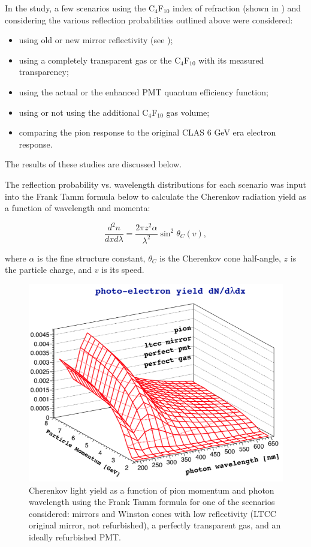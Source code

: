 In the study, a few scenarios using the C$_4$F$_{10}$ index of refraction (shown in )
and considering the various reflection probabilities outlined above  were considered:

\begin{itemize}
	\item using old or new mirror reflectivity (see );
	\item using a completely transparent gas or the C$_4$F$_{10}$ with its measured transparency;
	\item using the actual or the enhanced PMT quantum efficiency function;
	\item using or not using the additional C$_4$F$_{10}$ gas volume;
	\item comparing the pion response to the original CLAS 6 GeV era electron response.
\end{itemize}
\noindent
The results of these studies are discussed below.

The reflection probability vs. wavelength distributions for each scenario was input into the Frank\textendash
Tamm formula \cite{Frank:1937fk} below to calculate the Cherenkov radiation yield as a function of wavelength
and momenta:

\begin{equation}
  \label{eq:cerenkov}
  \frac{d^2n}{dxd\lambda} = \frac{2\pi z^2\alpha}{\lambda^2}\sin^2{\theta_C(v)},
\end{equation}

\noindent
where $\alpha$ is the fine structure constant, $\theta_C$ is the Cherenkov cone half-angle, $z$ is the particle
charge, and $v$ is its speed.

\begin{figure}
	\centering
	\includegraphics[width=0.98\columnwidth, height=0.75\columnwidth]{img/photonYieldStudy.png}
	\caption{Cherenkov light yield as a function of pion momentum and photon wavelength using the Frank\textendash
          Tamm formula for one of the scenarios considered: mirrors and Winston cones with low reflectivity (LTCC
          original mirror, not refurbished), a perfectly transparent gas, and an ideally refurbished PMT.}
	\label{fig:photonYieldStudy}
\end{figure}

